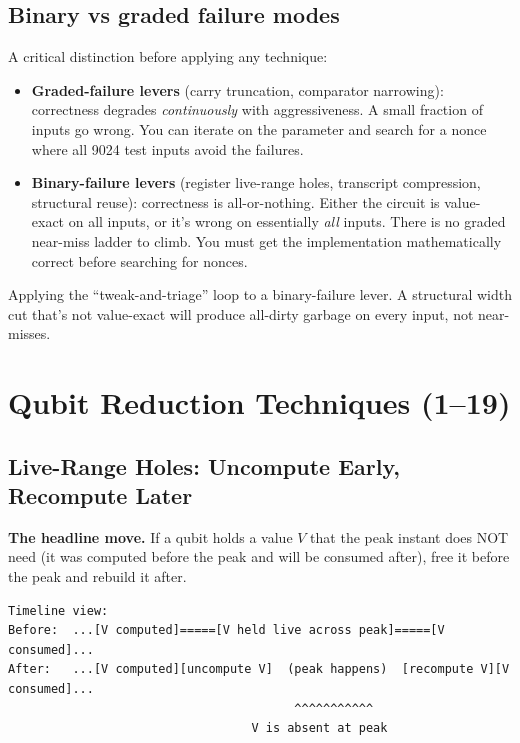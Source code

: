 \documentclass[11pt,a4paper]{article}
\begin{document}
\subsection{Binary vs graded failure modes}

A critical distinction before applying any technique:

\begin{itemize}
  \item \textbf{Graded-failure levers} (carry truncation, comparator narrowing): correctness
    degrades \emph{continuously} with aggressiveness. A small fraction of inputs go wrong. You can
    iterate on the parameter and search for a nonce where all 9024 test inputs avoid the failures.

  \item \textbf{Binary-failure levers} (register live-range holes, transcript compression,
    structural reuse): correctness is all-or-nothing. Either the circuit is value-exact on all
    inputs, or it's wrong on essentially \emph{all} inputs. There is no graded near-miss ladder
    to climb. You must get the implementation mathematically correct before searching for nonces.
\end{itemize}

\begin{tcolorbox}[noteboxstyle, title=The trap]
Applying the ``tweak-and-triage'' loop to a binary-failure lever.
A structural width cut that's not value-exact will produce all-dirty garbage on every input, not
near-misses.
\end{tcolorbox}

\section{Qubit Reduction Techniques (1--19)}
\label{sec:qubittech}

\subsection{Live-Range Holes: Uncompute Early, Recompute Later}
\label{sec:liverange}

\textbf{The headline move.} If a qubit holds a value $V$ that the peak instant does NOT need (it
was computed before the peak and will be consumed after), free it before the peak and rebuild it
after.

\begin{lstlisting}
Timeline view:
Before:  ...[V computed]=====[V held live across peak]=====[V consumed]...
After:   ...[V computed][uncompute V]  (peak happens)  [recompute V][V consumed]...
                                        ^^^^^^^^^^^
                                  V is absent at peak
\end{lstlisting}
\end{document}

